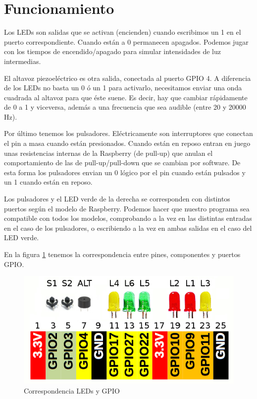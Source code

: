 \newpage

\section{Funcionamiento}

Los LEDs son salidas que se activan (encienden) cuando escribimos un 1
en el puerto correspondiente. Cuando están a 0 permanecen apagados. Podemos
jugar con los tiempos de encendido/apagado para simular intensidades de luz
intermedias.

El altavoz piezoeléctrico es otra salida, conectada al puerto GPIO 4. A diferencia
de los LEDs no basta un 0 ó un 1 para activarlo, necesitamos enviar una onda
cuadrada al altavoz para que éste suene. Es decir, hay que cambiar rápidamente de
0 a 1 y viceversa, además a una frecuencia que sea audible (entre 20 y 20000 Hz).

Por último tenemos los pulsadores. Eléctricamente son interruptores que conectan
el pin a masa cuando están presionados. Cuando están en reposo entran en juego
unas resistencias internas de la Raspberry (de pull-up) que anulan el comportamiento de
las de pull-up/pull-down que se cambian por software. De esta forma los pulsadores
envian un 0 lógico por el pin cuando están pulsados y un 1 cuando están en reposo.

Los pulsadores y el LED verde de la derecha se corresponden con
distintos puertos según el modelo de Raspberry. Podemos hacer que nuestro
programa sea compatible con todos los modelos, comprobando a la vez en las distintas
entradas en el caso de los pulsadores, o escribiendo a la vez en ambas salidas
en el caso del LED verde.

En la figura \ref{fig:pinout2} tenemos la correspondencia entre pines, componentes
y puertos GPIO.

\begin{figure}[h]
  \centering
    \includegraphics[width=14cm]{graphs/RaspberryGPIOaux.png}
  \caption{Correspondencia LEDs y GPIO}
  \label{fig:pinout2}
\end{figure}

\chapterend
